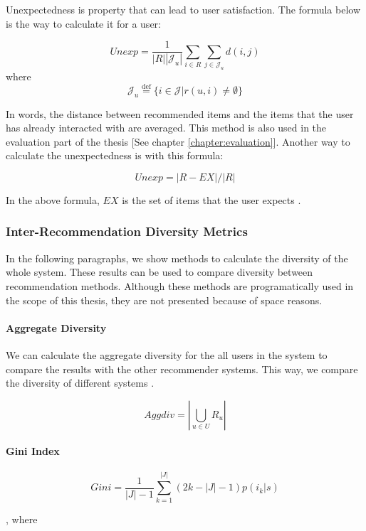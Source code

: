 Unexpectedness is property that can lead to user satisfaction. The formula below is the way to calculate it for a user:

$$
Unexp = \frac { 1 } { | R | \left| \mathcal { J } _ { u } \right| } \sum _ { i \in R } \sum _ { j \in \mathcal { J } _ { u } } d ( i , j )
$$
where 
$$
\mathcal { J } _ { u } \stackrel { \mathrm { def } } { = } \{ i \in \mathcal { J } | r ( u , i ) \neq \emptyset \}
$$

In words, the distance between recommended items and the items that the user has already interacted with are averaged. This method is also used in the evaluation part of the thesis [See chapter \ref{chapter:evaluation}]. Another way to calculate the unexpectedness is with this formula: 

$$
 Unexp = | R - E X | / | R |
$$

In the above formula, $EX$ is the set of items that the user expects \cite{castells2015novelty}.

\subsubsection{Inter-Recommendation Diversity Metrics}

In the following paragraphs, we show methods to calculate the diversity of the whole system. These results can be used to compare diversity between recommendation methods. Although these methods are programatically used in the scope of this thesis, they are not presented because of space reasons.

\paragraph{Aggregate Diversity}

We can calculate the aggregate diversity for the all users in the system to compare the results with the other recommender systems. This way, we compare the diversity of different systems \cite{castells2015novelty}.

$$
Aggdiv = \left| \bigcup _ { u \in{ U } } R _ { u } \right|
$$

\paragraph{Gini Index}

$$
Gini = \frac { 1 } { |{ J } | - 1 } \sum _ { k = 1 } ^ { | J | } ( 2 k - | J |  - 1 ) p \left( i _ { k } | s \right)
$$

, where

